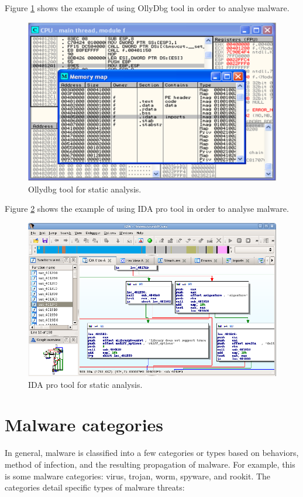 Figure \ref{fig:OllyDbg} shows the example of using OllyDbg tool in order to analyse malware. 


\begin{figure}[h!]
\centering
\includegraphics[width=1\textwidth]{graph/OllyDbg.png}
\caption{Ollydbg tool for static analysis.}
\label{fig:OllyDbg}
\end{figure}
Figure \ref{fig:IDApro} shows the example of using IDA pro tool in order to analyse malware. 

\begin{figure}[h!]
\centering
\includegraphics[width=1\textwidth]{graph/idapro.png}
\caption{IDA pro tool for static analysis.}
\label{fig:IDApro}
\end{figure}
\section{Malware categories}

In general, malware is classified into a few categories or types based on behaviors, method of infection, and the resulting propagation of malware. For example, this is some malware categories: virus, trojan, worm, spyware, and rookit. The categories detail specific types of malware threats:

